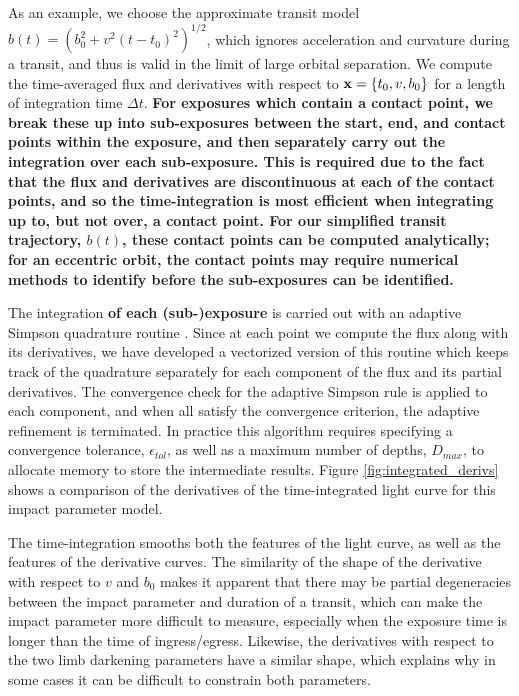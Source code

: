 \documentclass[modern,trackchanges]{aastex63}
\begin{document}
As an example, we choose the approximate transit model $b(t) = (b_0^2 + v^2(t-t_0)^2)^{1/2}$,
which ignores acceleration and curvature during a transit, and thus is valid in the
limit of large orbital separation.  We compute the time-averaged flux and derivatives
with respect to ${\mathbf{x}} = \{t_0,v,b_0\}$ for a length of integration time $\Delta t$.
{\bf For exposures which contain a contact point, we break these up into sub-exposures
between the start, end, and contact points within the exposure, and then separately
carry out the integration over each sub-exposure.  This is required due to the fact
that the flux and derivatives are discontinuous at each of the contact points, and
so the time-integration is most efficient when integrating up to, but not over,
a contact point.  For our simplified transit trajectory, $b(t)$, these contact points
can be computed analytically;  for an eccentric orbit, the contact points may require
numerical methods to identify before the sub-exposures can be identified.}

The integration {\bf of each (sub-)exposure} is carried out with an adaptive Simpson 
quadrature routine \citep{Kuncir1962}.  Since at each point we compute the flux along with
its derivatives, we have developed a vectorized version of this routine
which keeps track of the quadrature separately for each component of the
flux and its partial derivatives.  The convergence check for the adaptive
Simpson rule is applied to each component, and when all satisfy the
convergence criterion, the adaptive refinement is terminated.
In practice this algorithm requires specifying a convergence tolerance,
$\epsilon_{tol}$, as well as a maximum number of depths, $D_{max}$, to
allocate memory to store the intermediate results.
Figure \ref{fig:integrated_derivs} shows a
comparison of the derivatives of the time-integrated light curve for this
impact parameter model.

The time-integration smooths both the features of
the light curve, as well as the features of the derivative curves.  The similarity of
the shape of the derivative with respect to $v$ and $b_0$ makes it apparent
that there may be partial degeneracies between the impact parameter and duration
of a transit, which can make the impact parameter more difficult to measure, especially
when the exposure time is longer than the time of ingress/egress.  Likewise, the
derivatives with respect to the two limb darkening parameters have a similar shape,
which explains why in some cases it can be difficult to constrain both parameters.
\end{document}

